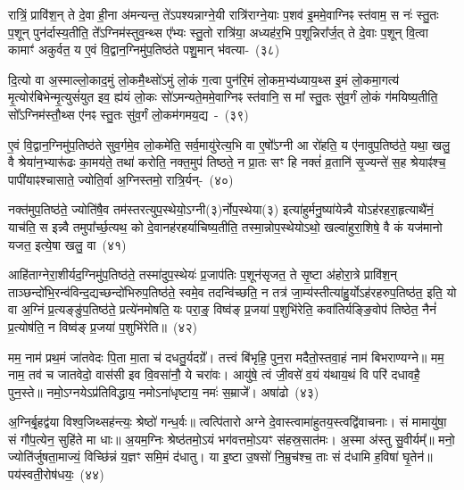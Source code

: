 रात्रिं॒ प्रावि॑श॒न् ते दे॒वा ही॒ना अ॑मन्यन्त॒ ते॑\-ऽपश्यन्नाग्ने॒यी रात्रि॑राग्ने॒याः प॒शव॑ इ॒ममे॒वाग्निꣴ स्त॑वाम॒ स नः॑ स्तु॒तः प॒शून् पुन॑र्दास्य॒तीति॒ ते᳚\-ऽग्निम॑स्तुव॒न्थ्स ए᳚भ्यः स्तु॒तो रात्रि॑या॒ अध्यह॑र॒भि प॒शून्निरा᳚र्ज॒त् ते दे॒वाः प॒शून् वि॒त्वा कामाꣳ॑ अकुर्वत॒ य ए॒वं वि॒द्वान॒ग्निमु॑प॒तिष्ठ॑ते पशु॒मान् भ॑वत्या-~(३८)

दि॒त्यो वा अ॒स्माल्लो॒काद॒मुं लो॒कमै॒थ्सो॑\-ऽमुं लो॒कं ग॒त्वा पुन॑रि॒मं लो॒कम॒भ्य॑ध्याय॒थ्स इ॒मं लो॒कमा॒गत्य॑ मृ॒त्योर॑बिभेन्मृ॒त्युसं॑युत इव॒ ह्य॑यं लो॒कः सो॑\-ऽमन्यते॒ममे॒वाग्निꣴ स्त॑वानि॒ स मा᳚ स्तु॒तः सु॑व॒र्गं लो॒कं ग॑मयिष्य॒तीति॒ सो᳚\-ऽग्निम॑स्तौ॒थ्स ए॑नꣴ स्तु॒तः सु॑व॒र्गं लो॒कम॑गमय॒द्य~-~(३९)

ए॒वं वि॒द्वान॒ग्निमु॑प॒तिष्ठ॑ते सुव॒र्गमे॒व लो॒कमे॑ति॒ सर्व॒मायु॑रेत्य॒भि वा ए॒षो᳚\-ऽग्नी आ रो॑हति॒ य ए॑नावुप॒तिष्ठ॑ते॒ यथा॒ खलु॒ वै श्रेया॑न॒भ्यारू॑ढः का॒मय॑ते॒ तथा॑ करोति॒ नक्त॒मुप॑ तिष्ठते॒ न प्रा॒तः सꣳ हि नक्तं॑ व्र॒तानि॑ सृ॒ज्यन्ते॑ स॒ह श्रेयाꣴ॑श्च॒ पापी॑याꣴश्चासाते॒ ज्योति॒र्वा अ॒ग्निस्तमो॒ रात्रि॒र्यन्-~(४०)

नक्त॑मुप॒तिष्ठ॑ते॒ ज्योति॑षै॒व तम॑स्तरत्युप॒स्थेयो॒\-ऽग्नी(३)र्नोप॒\-स्थेया(३) इत्या॑हुर्मनु॒ष्या॑येन्न्वै यो\-ऽह॑रहरा॒हृत्या\-थै॑नं॒ याच॑ति॒ स इन्न्वै तमुपा᳚र्च्छ॒त्यथ॒ को दे॒वानह॑रहर्याचिष्य॒तीति॒ तस्मा॒न्नोप॒स्थेयो\-ऽथो॒ खल्वा॑हुरा॒शिषे॒ वै कं यज॑मानो यजत॒ इत्ये॒षा खलु॒ वा~(४१)

आहि॑ताग्नेरा॒शीर्यद॒ग्नि\-मु॑प॒तिष्ठ॑ते॒ तस्मा॑दुप॒स्थेयः॑ प्र॒जा\-प॑तिः प॒शून॑सृजत॒ ते सृ॒ष्टा अ॑होरा॒त्रे प्रावि॑श॒न् ताञ्छन्दो॑\-भि॒रन्व॑\-विन्द॒द्यच्छन्दो॑भि\-रुप॒तिष्ठ॑ते॒ स्वमे॒व तदन्वि॑च्छति॒ न तत्र॑ जा॒म्य॑स्तीत्या॑हु॒र्यो\-ऽह॑रहरुप॒तिष्ठ॑त॒ इति॒ यो वा अ॒ग्निं प्र॒त्यङ्ङु॑प॒तिष्ठ॑ते॒ प्रत्ये॑नमोषति॒ यः परा॒ङ्॒ विष्व॑ङ् प्र॒जया॑ प॒शुभि॑रेति॒ कवा॑तिर्यङ्ङि॒वोप॑ तिष्ठेत॒ नैनं॑ प्र॒त्योष॑ति॒ न विष्व॑ङ् प्र॒जया॑ प॒शुभि॑रेति॥~(४२)

{\anuvakamend[{सि॒क्तस्य॑ स॒ह भ॑वति॒ यो यत्खलु॒ वै प॒शुभि॒स्त्रयो॑दश च}]}%

मम॒ नाम॑ प्रथ॒मं जा॑तवेदः पि॒ता मा॒ता च॑ दधतु॒र्यदग्रे᳚। तत्त्वं बि॑भृहि॒ पुन॒रा मदैतो॒स्तवा॒हं नाम॑ बिभराण्यग्ने॥ मम॒ नाम॒ तव॑ च जातवेदो॒ वास॑सी इव वि॒वसा॑नौ॒ ये चरा॑वः। आयु॑षे॒ त्वं जी॒वसे॑ व॒यं य॑थाय॒थं वि परि॑ दधावहै॒ पुन॒स्ते॥ नमो॒\-ऽग्नये\-ऽप्र॑तिविद्धाय॒ नमो\-ऽना॑धृष्टाय॒ नमः॑ स॒म्राजे᳚। अषा॑ढो~(४३)

अ॒ग्निर्बृ॒हद्व॑या विश्व॒जिथ्सह॑न्त्यः॒ श्रेष्ठो॑ गन्ध॒र्वः॥ त्वत्पि॑तारो अग्ने दे॒वास्त्वामा॑\-हुतय॒स्त्वद्वि॑वाचनाः। सं मामायु॑षा॒ सं गौ॑प॒त्येन॒ सुहि॑ते मा धाः॥ अ॒यम॒ग्निः श्रेष्ठ॑तमो॒\-ऽयं भग॑वत्तमो॒\-ऽयꣳ स॑हस्र॒सात॑मः। अ॒स्मा अ॑स्तु सु॒वीर्यम्᳚॥ मनो॒ ज्योति॑र्जुषता॒माज्यं॒ विच्छि॑न्नं य॒ज्ञꣳ समि॒मं द॑धातु। या इ॒ष्टा उ॒षसो॑ नि॒म्रुच॑श्च॒ ताः सं द॑धामि ह॒विषा॑ घृ॒तेन॑॥ पय॑स्वती॒रोष॑धयः॒~(४४)

